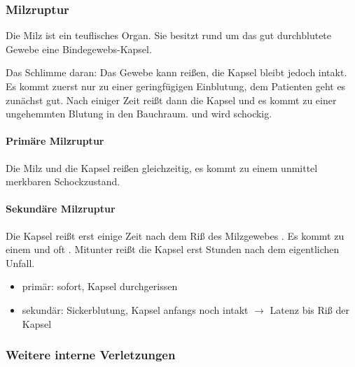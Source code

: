 \subsubsection{Milzruptur}

Die Milz ist ein teuflisches Organ. Sie besitzt rund um
das gut durchblutete Gewebe eine Bindegewebs-Kapsel.

Das
Schlimme daran: Das Gewebe kann reißen, die Kapsel bleibt
jedoch intakt. Es kommt zuerst nur zu einer geringfügigen
Einblutung, dem Patienten geht es zunächst gut. Nach
einiger Zeit reißt dann die Kapsel und es kommt zu einer
ungehemmten Blutung in den Bauchraum.  und wird
schockig.

\paragraph{Primäre Milzruptur} Die Milz und die Kapsel
reißen gleichzeitig, es kommt zu einem unmittel merkbaren
Schockzustand.

\paragraph{Sekundäre Milzruptur} Die Kapsel reißt erst
einige Zeit nach dem Riß des Milzgewebes .
Es kommt zu einem  und oft
. Mitunter reißt die
Kapsel erst Stunden nach dem eigentlichen Unfall. 

\begin{itemize}
    \item prim\"ar: sofort, Kapsel durchgerissen
    \item sekund\"ar: Sickerblutung, Kapsel anfangs noch intakt
    ${\rightarrow}$ Latenz bis Ri{\ss} der Kapsel
\end{itemize}




\subsubsection{Weitere interne Verletzungen}

